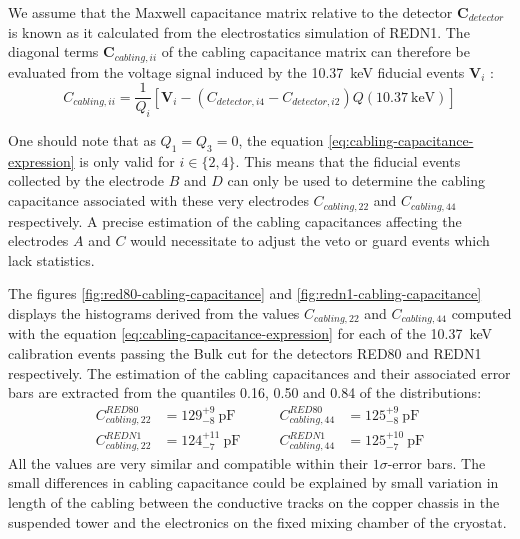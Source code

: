 We assume that the Maxwell capacitance matrix relative to the detector $\bm{C}_{detector}$ is known as it calculated from the electrostatics simulation of REDN1. The diagonal terms $\bm{C}_{cabling, ii}$ of the cabling capacitance matrix can therefore be evaluated from the voltage signal induced by the \SI{10.37}{\kilo\eV} fiducial events $\bm{V}_{i}$ :
\begin{equation}
\label{eq:cabling-capacitance-expression}
C_{cabling, ii}
=
\frac{1}{Q_i} \left[ \bm{V}_{i} - \left( C_{detector, i4} - C_{detector, i2} \right) Q(\SI{10.37}{\kilo\eV}) \right]
\end{equation}

One should note that as $Q_1 = Q_3 = 0$, the equation \ref{eq:cabling-capacitance-expression} is only valid for $i \in \{ 2,4 \}$. This means that the fiducial events collected by the electrode $B$ and $D$ can only be used to determine the cabling capacitance associated with these very electrodes $C_{cabling, 22}$ and $C_{cabling, 44}$ respectively. A precise estimation of the cabling capacitances affecting the electrodes $A$ and $C$ would necessitate to adjust the veto or guard events which lack statistics.

The figures \ref{fig:red80-cabling-capacitance} and \ref{fig:redn1-cabling-capacitance} displays the histograms derived from the values $C_{cabling, 22}$ and $C_{cabling, 44}$ computed with the equation \ref{eq:cabling-capacitance-expression} for each of the \SI{10.37}{\kilo\eV} calibration events passing the Bulk cut for the detectors RED80 and REDN1 respectively. The estimation of the cabling capacitances and their associated error bars are extracted from the quantiles 0.16, 0.50 and 0.84 of the distributions:
\begin{align}
C_{cabling, 22}^{RED80} &= 129_{-8}^{+9} \ \si{\pico\farad}
\quad \quad 
& C_{cabling, 44}^{RED80} &= 125_{-8}^{+9} \ \si{\pico\farad}
\\
C_{cabling, 22}^{REDN1} &= 124_{-7}^{+11} \ \si{\pico\farad}
\quad \quad 
& C_{cabling, 44}^{REDN1} &= 125_{-7}^{+10} \ \si{\pico\farad}
\end{align}
All the values are very similar and compatible within their $1\sigma$-error bars. The small differences in cabling capacitance could be explained by small variation in length of the cabling between the conductive tracks on the copper chassis in the suspended tower and the electronics on the fixed mixing chamber of the cryostat.

